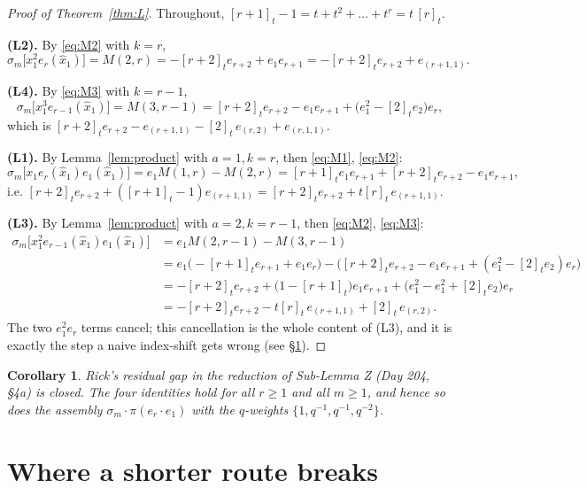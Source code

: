 \documentclass[11pt]{article}
\theoremstyle{plain}
\newtheorem{corollary}[theorem]{Corollary}
\theoremstyle{definition}
\newcommand{\qt}[1]{[#1]_t}
\newcommand{\hx}{\widehat{x}}
\newcommand{\sm}{\sigma_m}
\begin{document}
\begin{proof}[Proof of Theorem~\ref{thm:L}]
Throughout, $\qt{r+1}-1=t+t^2+\dots+t^{r}=t\,\qt{r}$.

\medskip\noindent\textbf{(L2).} By \eqref{eq:M2} with $k=r$,
\[
  \sm\bigl[x_1^2e_r(\hx_1)\bigr]=M(2,r)=-\qt{r+2}e_{r+2}+e_1e_{r+1}
  =-\qt{r+2}e_{r+2}+e_{(r+1,1)} .
\]

\medskip\noindent\textbf{(L4).} By \eqref{eq:M3} with $k=r-1$,
\[
  \sm\bigl[x_1^3e_{r-1}(\hx_1)\bigr]=M(3,r-1)
  =\qt{r+2}e_{r+2}-e_1e_{r+1}+\bigl(e_1^2-\qt2 e_2\bigr)e_r,
\]
which is $\qt{r+2}e_{r+2}-e_{(r+1,1)}-\qt2\,e_{(r,2)}+e_{(r,1,1)}$.

\medskip\noindent\textbf{(L1).} By Lemma~\ref{lem:product} with $a=1,k=r$, then \eqref{eq:M1},
\eqref{eq:M2}:
\[
  \sm\bigl[x_1e_r(\hx_1)e_1(\hx_1)\bigr]=e_1M(1,r)-M(2,r)
   =\qt{r+1}e_1e_{r+1}+\qt{r+2}e_{r+2}-e_1e_{r+1},
\]
i.e. $\qt{r+2}e_{r+2}+(\qt{r+1}-1)e_{(r+1,1)}=\qt{r+2}e_{r+2}+t\qt{r}\,e_{(r+1,1)}$.

\medskip\noindent\textbf{(L3).} By Lemma~\ref{lem:product} with $a=2,k=r-1$, then \eqref{eq:M2},
\eqref{eq:M3}:
\begin{align*}
  \sm\bigl[x_1^2e_{r-1}(\hx_1)e_1(\hx_1)\bigr]&=e_1M(2,r-1)-M(3,r-1)\\
  &=e_1\bigl(-\qt{r+1}e_{r+1}+e_1e_{r}\bigr)
    -\bigl(\qt{r+2}e_{r+2}-e_1e_{r+1}+(e_1^2-\qt2 e_2)e_{r}\bigr)\\
  &=-\qt{r+2}e_{r+2}+\bigl(1-\qt{r+1}\bigr)e_1e_{r+1}
     +\bigl(e_1^2-e_1^2+\qt2 e_2\bigr)e_r\\
  &=-\qt{r+2}e_{r+2}-t\qt{r}\,e_{(r+1,1)}+\qt2\,e_{(r,2)} .
\end{align*}
The two $e_1^2e_r$ terms cancel; this cancellation is the whole content of (L3), and it is
exactly the step a naive index-shift gets wrong (see \S\ref{sec:error}).
\end{proof}

\begin{corollary}
Rick's residual gap in the reduction of Sub-Lemma Z (Day 204, \S4a) is closed. The four
identities hold for all $r\ge1$ and all $m\ge1$, and hence so does the assembly
$\sm\cdot\pi(e_r\cdot e_1)$ with the $q$-weights $\{1,q^{-1},q^{-1},q^{-2}\}$.
\end{corollary}

\section{Where a shorter route breaks}\label{sec:error}
\end{document}
